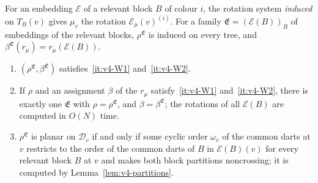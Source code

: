 For an embedding $\mathcal E$ of a relevant block $B$ of colour $i$, the
rotation system \emph{induced} on $T_B(v)$ gives $\mu_v$ the rotation
$\mathcal E_\mu(v)^{(i)}$. For a family $\mathfrak E=(\mathcal E(B))_B$ of
embeddings of the relevant blocks, $\rho^{\mathfrak E}$ is induced on every
tree, and $\beta^{\mathfrak E}(r_\mu)=r_\mu(\mathcal E(B))$.

\begin{lemma}\label{lem:v4-induced}
\leavevmode
\begin{enumerate}[label=(\alph*),nosep]
\item $(\rho^{\mathfrak E},\beta^{\mathfrak E})$
satisfies~\ref{it:v4-W1} and~\ref{it:v4-W2}.
\item If $\rho$ and an assignment $\beta$ of the $r_\mu$
satisfy~\ref{it:v4-W1} and~\ref{it:v4-W2}, there is exactly one $\mathfrak E$
with $\rho=\rho^{\mathfrak E}$, and $\beta=\beta^{\mathfrak E}$; the rotations
of all $\mathcal E(B)$ are computed in $O(N)$ time.
\item $\rho^{\mathfrak E}$ is planar on $\mathcal D_v$ if and only if some
cyclic order $\omega_v$ of the common darts at $v$ restricts to the order of
the common darts of $B$ in $\mathcal E(B)(v)$ for every relevant block $B$ at
$v$ and makes both block partitions noncrossing; it is computed by
Lemma~\ref{lem:v4-partitions}.
\end{enumerate}
\end{lemma}


